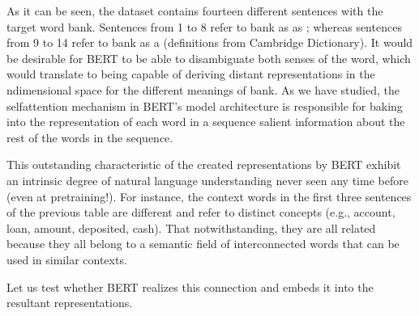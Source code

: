 \documentclass[letterpaper,10pt,english]{sphinxmanual}
\begin{document}
As it can be seen, the dataset contains fourteen different sentences with the target word bank. Sentences from 1 to 8 refer to bank as as ; whereas sentences from 9 to 14 refer to bank as a  (definitions from Cambridge Dictionary). It would be desirable for BERT to be able to
disambiguate both senses of the word, which would translate to being capable of deriving distant representations in the n\sphinxhyphen{}dimensional space for the different meanings of bank. As we have studied, the self\sphinxhyphen{}attention mechanism in BERT’s model architecture is responsible for baking into the representation of each word in a sequence salient information about the rest of the words in the sequence.

This outstanding characteristic of the created representations by BERT exhibit an intrinsic degree of natural language understanding never seen any time before (even at pretraining!). For instance, the context words in the first three sentences of the previous table are different and refer to distinct concepts (e.g., account, loan, amount, deposited, cash). That notwithstanding, they are all related because they all belong to a semantic field of interconnected words that can be used in similar
contexts.

Let us test whether BERT realizes this connection and embeds it into the resultant representations.

{
\begin{sphinxVerbatim}[commandchars=\\\{\}]
\llap{\color{nbsphinxin}[8]:\,\hspace{\fboxrule}\hspace{\fboxsep}}   
\end{sphinxVerbatim}
}
\end{document}

